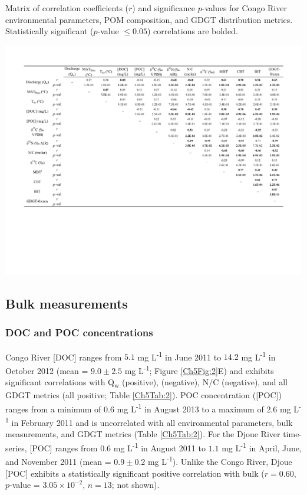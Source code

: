 \begin{table}
	\caption[Environmental parameter, POM, and GDGT correlation coefficients]{Matrix of correlation coefficients ($r$) and significance $p$-values for Congo River environmental parameters, POM composition, and GDGT distribution metrics. Statistically significant ($p$-value $\leq 0.05$) correlations are bolded.}
	\centering
		\includegraphics{Thesis_Tables/Ch5Tab2}
	\label{Ch5Tab:2} 
\end{table}

\subsection{Bulk measurements}

\subsubsection{DOC and POC concentrations}

Congo River [DOC] ranges from $5.1$ mg L\textsuperscript{-1} in June 2011 to $14.2$ mg L\textsuperscript{-1} in October 2012 (mean = $9.0 \pm 2.5$ mg L\textsuperscript{-1}; Figure \ref{Ch5Fig:2}E) and exhibits significant correlations with Q\textsubscript{w} (positive),  (negative), N/C (negative), and all GDGT metrics (all positive; Table \ref{Ch5Tab:2}). POC concentration ([POC]) ranges from a minimum of $0.6$ mg L\textsuperscript{-1} in August 2013 to a maximum of $2.6$ mg L\textsuperscript{-1} in February 2011 \citep[mean = $1.3 \pm 0.4$ mg L\textsuperscript{-1}; Figure \ref{Ch5Fig:2}F;][]{Hemingway:2016bq} and is uncorrelated with all environmental parameters, bulk measurements, and GDGT metrics (Table \ref{Ch5Tab:2}). For the Djoue River time-series, [POC] ranges from $0.6$ mg L\textsuperscript{-1} in August 2011 to $1.1$ mg L\textsuperscript{-1} in April, June, and November 2011 (mean = $0.9 \pm 0.2$ mg L\textsuperscript{-1}). Unlike the Congo River, Djoue [POC] exhibits a statistically significant positive correlation with bulk  ($r = 0.60$, $p$-value = $3.05 \times 10^{-2}$, $n = 13$; not shown).

